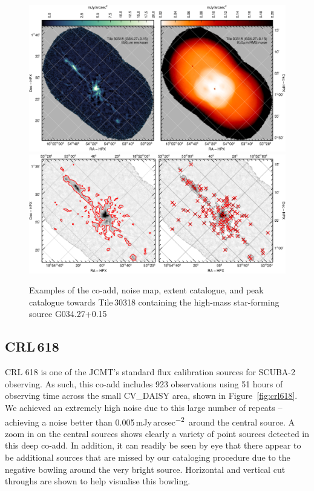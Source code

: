 \documentclass[twocolumn,times]{aastex6}
\newcommand{\jyas}{Jy\,arcsec\textsuperscript{$-$2}}
\begin{document}
\begin{figure}
  \centering
  \includegraphics{tile30318-g34-coadd-noise.pdf}
  \\[3mm]
  \includegraphics{tile30318-g34-extent-peak.pdf}
  \caption{Examples of the co-add, noise map, extent catalogue, and peak
    catalogue towards Tile\,30318 containing the high-mass star-forming
    source G034.27+0.15}
  \label{fig:g34-3}
\end{figure}
\subsection{CRL\,618}
CRL 618 is one of the JCMT's standard flux calibration sources for
SCUBA-2 observing. As such, this co-add includes 923 observations using
51 hours of observing time across the small CV\_DAISY area, shown in
Figure~\ref{fig:crl618}. We achieved an extremely high noise due to
this large number of repeats -- achieving a noise better than
0.005\,m\jyas\ around the central source. A zoom in on the central
sources shows clearly a variety of point sources detected in this deep
co-add. In addition, it can readily be seen by eye that there appear to
be additional sources that are missed by our cataloging procedure due
to the negative bowling around the very bright source. Horizontal and
vertical cut throughs are shown to help visualise this bowling.
\end{document}
